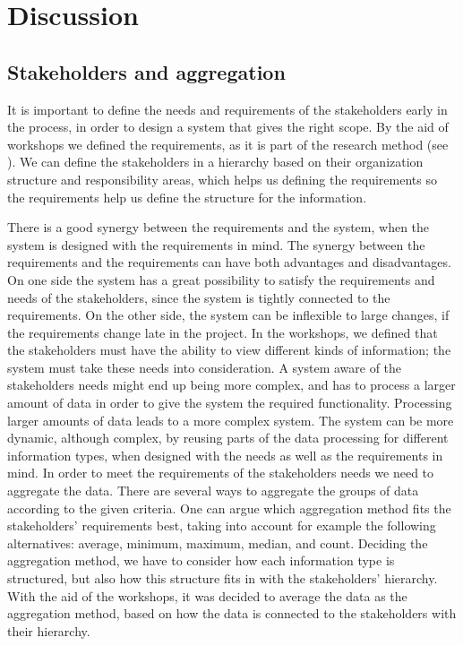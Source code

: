 \chapter{Discussion}
\label{chapter:discussion}

\section{Stakeholders and aggregation} %
\label{sec:discussion_stakeholders_and_aggregation}
It is important to define the needs and requirements of the stakeholders early 
in the process, in order to design a system that gives the right scope. 
By the aid of workshops we defined the requirements, as it is part of the 
research method (see ). We can define the stakeholders in a 
hierarchy based on their organization structure and responsibility areas, 
which helps us defining the requirements so the requirements help us define 
the structure for the information.

There is a good synergy between the requirements and the system, when the 
system is designed with the requirements in mind. The synergy between the
requirements and the requirements can have both advantages and disadvantages. 
On one side the system has a great possibility to satisfy the requirements and 
needs of the stakeholders, since the system is tightly connected to the 
requirements. On the other side, the system can be inflexible to large 
changes, if the requirements change late in the project.  In the workshops, we 
defined that the stakeholders must have the ability to view different kinds of 
information; the system must take these needs into consideration. A system 
aware of the stakeholders needs might end up being more complex, and has to 
process a larger amount of data in order to give the system the required 
functionality. Processing larger amounts of data leads to a more complex 
system. The system can be more dynamic, although complex, by reusing parts of 
the data processing for different information types, when designed with the 
needs as well as the requirements in mind. In order to meet the requirements 
of the stakeholders needs we need to aggregate the data. There are several 
ways to aggregate the groups of data according to the given criteria. One can 
argue which aggregation method fits the stakeholders' requirements best, 
taking into account for example the following alternatives: average, minimum, 
maximum, median, and count. Deciding the aggregation method, we have to 
consider how each information type is structured, but also how this structure 
fits in with the stakeholders' hierarchy. With the aid of the workshops, it 
was decided to average the data as the aggregation method, based on how the 
data is connected to the stakeholders with their hierarchy.



